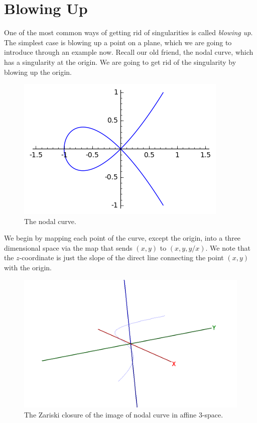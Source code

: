 \documentclass[12pt,a4paper,leqno]{article}
\theoremstyle{plain}
\theoremstyle{definition}
\theoremstyle{remark}
\begin{document}
\section{Blowing Up}\label{BlowUp}

One of the most common ways of getting rid of singularities is called \emph{blowing up}. The simplest case is blowing up a point on a plane, which we are going to introduce through an example now. Recall our old friend, the nodal curve, which has a singularity at the origin. We are going to get rid of the singularity by blowing up the origin.

\begin{figure}[!htbp]\label{node3}
\begin{center}
\includegraphics{pics/node.png}
\caption{The nodal curve.}
\end{center}
\end{figure}

We begin by mapping each point of the curve, except the origin, into a three dimensional space via the map that sends $(x,y)$ to $(x,y,y/x)$. We note that the $z$-coordinate is just the slope of the direct line connecting the point $(x,y)$ with the origin.

\begin{figure}[!htbp]\label{blownUpNode}
\begin{center}
\includegraphics[scale=0.8]{pics/blown_up_node.png}
\caption{The Zariski closure of the image of nodal curve in affine 3-space.}
\end{center}
\end{figure}
\end{document}
